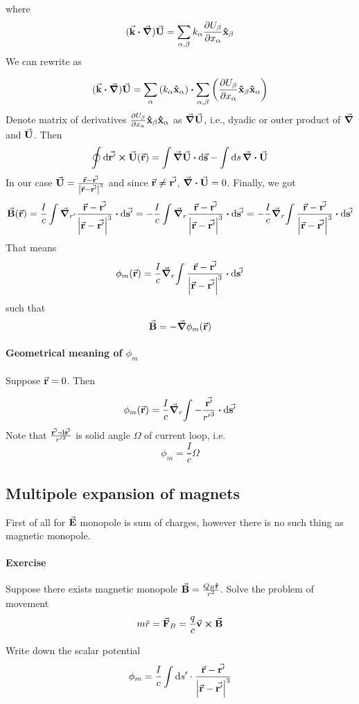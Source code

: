 
where
$$(\va{k} \vdot \grad)\va{U} = \sum_{\alpha, \beta } k_\alpha  \pdv{U_\beta}{x_\alpha} \vu{x}_\beta$$
We can rewrite as

$$(\va{k} \vdot \grad)\va{U} = \sum_{\alpha } \qty(k_\alpha \vu{x}_\alpha) \vdot \sum_{\alpha, \beta } \qty(\pdv{U_\beta}{x_\alpha} \vu{x}_\beta \vu{x}_\alpha)$$
Denote matrix of derivatives $\pdv{U_\beta}{x_\alpha} \vu{x}_\beta \vu{x}_\alpha$ as $\grad{\va{U}}$, i.e., dyadic or outer product of $\grad$ and $\va{U}$.
Then
$$\oint \dd{\va{r'}} \cross \va{U}(\va{r}) = \int \grad{\va{U}} \vdot \dd{\va{s}} - \int \dd{s} \div{\va{U}}$$
In our case $\va{U} =\frac{\va{r}-\va{r'}}{\abs{\va{r}-\va{r'}}^3}$ and since $\va{r} \neq \va{r'}$, $\div{\va{U}} = 0$.
Finally, we got
$$\va{B}(\va{r}) = \frac{I}{c} \int \grad_{r'}{\frac{\va{r}-\va{r'}}{\abs{\va{r}-\va{r'}}^3}} \vdot \dd{\va{s'}} = -\frac{I}{c} \int \grad_r{\frac{\va{r}-\va{r'}}{\abs{\va{r}-\va{r'}}^3}} \vdot \dd{\va{s'}} = -\frac{I}{c} \grad_r{\int \frac{\va{r}-\va{r'}}{\abs{\va{r}-\va{r'}}^3}} \vdot \dd{\va{s'}}$$
That means
$$\phi_m(\va{r}) = \frac{I}{c} \grad_r{\int \frac{\va{r}-\va{r'}}{\abs{\va{r}-\va{r'}}^3}} \vdot \dd{\va{s'}}$$
such that
$$\va{B}= -\grad \phi_m(\va{r})$$

\paragraph{Geometrical meaning of $\phi_m$}
Suppose $\va{r}=0$. Then

$$\phi_m(\va{r}) = \frac{I}{c} \grad_r{\int -\frac{\va{r'}}{{r'}^3}} \vdot \dd{\va{s'}}$$
Note that $\frac{\va{r'}\vdot \dd{\va{s'}}}{{r'}^3} $ is solid angle $\Omega$ of current loop, i.e.
$$\phi_m = \frac{I}{c} \Omega$$

\subsection{Multipole expansion of magnets}
First of all for $\va{E}$ monopole is sum of charges, however there is no such thing as magnetic monopole.
\paragraph{Exercise}
Suppose there exists magnetic monopole $\va{B}= \frac{Q_B \vu{r}}{r^2}$. Solve the problem of movement
$$m\ddot{r} = \va{F}_B = \frac{q}{c} \va{v} \cross \va{B}$$

Write down the scalar potential
$$\phi_m = \frac{I}{c} \int \dd{s'} \cdot \frac{\va{r} - \va{r'}}{\abs{\va{r} - \va{r'}}^3}$$
